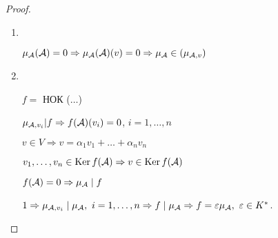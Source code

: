 \documentclass[main]{subfiles}
\begin{document}
\begin{proof}
    \begin{enumerate}
        \item
              \
              \begin{center}
                  $\mu_{\mathcal{A}}(\mathcal{A}) = 0 \Rightarrow \mu_{\mathcal{A}}(\mathcal{A})(v) = 0 \Rightarrow \mu_{\mathcal{A}} \in (\mu_{\mathcal{A}, v})$
              \end{center}
        \item
              \
              \begin{center}
                  $f = $ НОК ($\ldots$)

                  $\mu_{\mathcal{A}, v_i} | f \Rightarrow f(\mathcal{A})(v_i) = 0$, $i = 1, \ldots, n$

                  $v \in V \Rightarrow v = \alpha_1 v_1 + \ldots + \alpha_n v_n$

                  $v_1, \ldots, v_n \in \operatorname{Ker} f(\mathcal{A}) \Rightarrow v \in \operatorname{Ker} f(\mathcal{A})$

                  $f(\mathcal{A}) = 0 \Rightarrow \mu_{\mathcal{A}} \mid f$

                  $ 1 \Rightarrow \mu_{\mathcal{A}, v_i} \mid \mu_{\mathcal{A}}, \ i=1, \ldots, n \Rightarrow f \mid \mu_{\mathcal{A}} \Rightarrow f = \varepsilon \mu_{\mathcal{A}}, \ \varepsilon \in K^*$.
              \end{center}
    \end{enumerate}
\end{proof}
\end{document}

